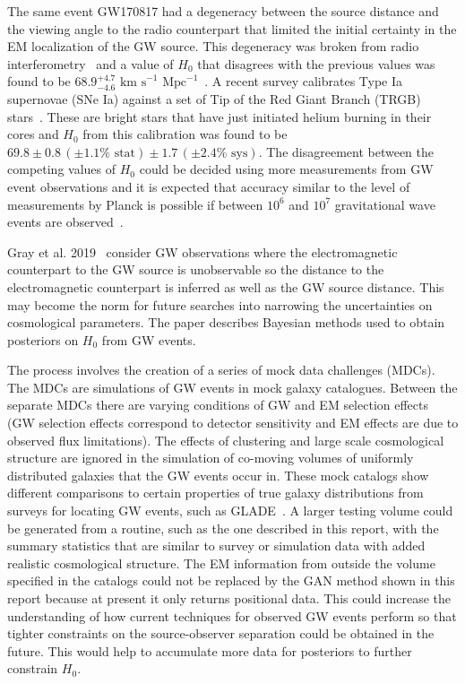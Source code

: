 \documentclass[twocolumn]{article}
\numberwithin{equation}{section}
\begin{document}
The same event GW170817 had a degeneracy between the source distance and the viewing angle to the radio counterpart that limited the initial certainty in the EM localization of the GW source. This degeneracy was broken from radio interferometry~\cite{GW170817_source_radio} and a value of $H_0$ that disagrees with the previous values was found to be $68.9^{+4.7}_{-4.6} \text{ km s}^{-1} \text{ Mpc}^{-1}$~\cite{GW170817_jet_H0}. A recent survey calibrates Type Ia supernovae (SNe Ia) against a set of Tip of the Red Giant Branch (TRGB) stars~\cite{H0_redgiant}. These are bright stars that have just initiated helium burning in their cores and $H_0$ from this calibration was found to be $69.8 \pm 0.8 \, (\pm1.1\% \text{ stat}) \pm 1.7 \, (\pm2.4\% \text{ sys})$. The disagreement between the competing values of $H_0$ could be decided using more measurements from GW event observations and it is expected that accuracy similar to the level of measurements by Planck is possible if between $10^6$ and $10^7$ gravitational wave events are observed~\cite{chris_planck_gw}.

Gray et al. 2019~\cite{gray} consider GW observations where the electromagnetic counterpart to the GW source is unobservable so the distance to the electromagnetic counterpart is inferred as well as the GW source distance. This may become the norm for future searches into narrowing the uncertainties on cosmological parameters. The paper describes Bayesian methods used to obtain posteriors on $H_0$ from GW events.

The process involves the creation of a series of mock data challenges (MDCs). The MDCs are simulations of GW events in mock galaxy catalogues. Between the separate MDCs there are varying conditions of GW and EM selection effects (GW selection effects correspond to detector sensitivity and EM effects are due to observed flux limitations). The effects of clustering and large scale cosmological structure are ignored in the simulation of co-moving volumes of uniformly distributed galaxies that the GW events occur in. These mock catalogs show different comparisons to certain properties of true galaxy distributions from surveys for locating GW events, such as GLADE~\cite{GLADE}. %
A larger testing volume could be generated from a routine, such as the one described in this report, with the summary statistics that are similar to survey or simulation data with added realistic cosmological structure. The EM information from outside the volume specified in the catalogs could not be replaced by the GAN method shown in this report because at present it only returns positional data. This could increase the understanding of how current techniques for observed GW events perform so that tighter constraints on the source-observer separation could be obtained in the future. This would help to accumulate more data for posteriors to further constrain $H_0$.
\end{document}
